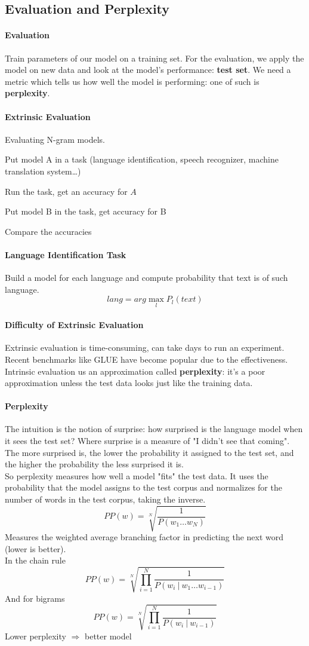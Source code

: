 \documentclass[10pt]{report}
\begin{document}
\subsection{Evaluation and Perplexity}
\paragraph{Evaluation} Train parameters of our model on a training set. For the evaluation, we apply the model on new data and look at the model's performance: \textbf{test set}. We need a metric which tells us how well the model is performing: one of such is \textbf{perplexity}.
\paragraph{Extrinsic Evaluation} Evaluating N-gram models.\begin{list}{}{}
	\item Put model A in a task (language identification, speech recognizer, machine translation system\ldots)
	\item Run the task, get an accuracy for $A$
	\item Put model B in the task, get accuracy for B
	\item Compare the accuracies
\end{list}
\paragraph{Language Identification Task} Build a model for each language and compute probability that text is of such language.
$$lang = arg\max_l P_l(text)$$
\paragraph{Difficulty of Extrinsic Evaluation} Extrinsic evaluation is time-consuming, can take days to run an experiment. Recent benchmarks like GLUE have become popular due to the effectiveness.\\
Intrinsic evaluation us an approximation called \textbf{perplexity}: it's a poor approximation unless the test data looks just like the training data.
\paragraph{Perplexity} The intuition is the notion of surprise: how surprised is the language model when it sees the test set? Where surprise is a measure of "I didn't see that coming". The more surprised is, the lower the probability it assigned to the test set, and the higher the probability the less surprised it is.\\
So perplexity measures how well a model "fits" the test data. It uses the probability that the model assigns to the test corpus and normalizes for the number of words in the test corpus, taking the inverse. $$PP(w) = \sqrt[N]{\frac{1}{P(w_1\ldots w_N)}}$$
Measures the weighted average branching factor in predicting the next word (lower is better).\\
In the chain rule $$PP(w) = \sqrt[N]{\prod_{i=1}^N\frac{1}{P(w_i\:|\:w_1\ldots w_{i-1})}}$$
And for bigrams $$PP(w) = \sqrt[N]{\prod_{i=1}^N\frac{1}{P(w_i\:|\:w_{i-1})}}$$
Lower perplexity $\Rightarrow$ better model
\end{document}
